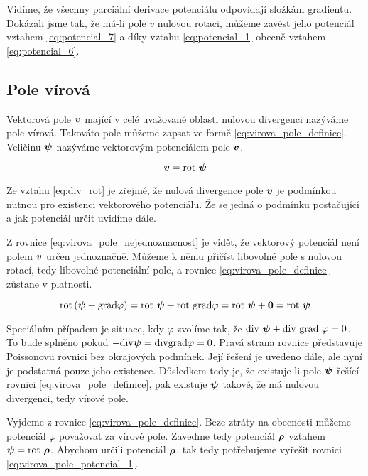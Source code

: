 Vidíme, že všechny parciální derivace potenciálu odpovídají složkám gradientu. Dokázali jsme tak, že má-li pole \(v\) nulovou rotaci, můžeme zavést jeho
potenciál vztahem \eqref{eq:potencial_7} a díky vztahu \eqref{eq:potencial_1} obecně vztahem \eqref{eq:potencial_6}.

\subsection{Pole vírová}
\label{sec:pole_virova}

Vektorová pole \(\boldsymbol{v}\) mající v celé uvažované oblasti nulovou divergenci nazýváme pole vírová. Takováto pole můžeme zapsat ve formě 
\eqref{eq:virova_pole_definice}. Veličinu \(\boldsymbol{\psi}\) nazýváme vektorovým potenciálem pole \(\boldsymbol{v}\).

\begin{equation}
\label{eq:virova_pole_definice}
\boldsymbol{v} = \mathrm{rot} \ \boldsymbol{\psi}
\end{equation}

Ze vztahu \eqref{eq:div_rot} je zřejmé, že nulová divergence pole \(\boldsymbol{v}\) je podmínkou nutnou pro existenci vektorového potenciálu. Že se jedná o podmínku postačující a jak potenciál určit uvidíme dále.

Z rovnice \eqref{eq:virova_pole_nejednoznacnost} je vidět, že vektorový potenciál není polem \(\boldsymbol{v}\) určen jednoznačně.
Můžeme k němu přičíst libovolné pole s nulovou rotací, tedy libovolné potenciální pole, a rovnice \eqref{eq:virova_pole_definice}
zůstane v platnosti.

\begin{equation}
\label{eq:virova_pole_nejednoznacnost}
\mathrm{rot} \left(\boldsymbol{\psi} + \mathrm{grad} \varphi \right) = \mathrm{rot} \ \boldsymbol{\psi} + \mathrm{rot} \ \mathrm{grad} \varphi =
\mathrm{rot} \ \boldsymbol{\psi} + \boldsymbol{0} = \mathrm{rot} \ \boldsymbol{\psi}
\end{equation}

Speciálním případem je situace, kdy \(\varphi\) zvolíme tak, že \(\mathrm{div} \ \boldsymbol{\psi} + \mathrm{div} \ \mathrm{grad} \ \varphi = 0\). To bude splněno pokud
\(-\mathrm{div} \boldsymbol{\psi} = \mathrm{div} \mathrm{grad} \varphi = 0\). Pravá strana rovnice představuje Poissonovu rovnici bez okrajových podmínek.
Její řešení je uvedeno dále, ale nyní je podstatná pouze jeho existence. Důsledkem tedy je, že existuje-li pole \(\boldsymbol{\psi}\) řešící
rovnici \eqref{eq:virova_pole_definice}, pak existuje \(\boldsymbol{\psi}\) takové, že má nulovou divergenci, tedy vírové pole.

Vyjdeme z rovnice \eqref{eq:virova_pole_definice}. Beze ztráty na obecnosti můžeme potenciál \(\varphi\) považovat za vírové pole.
Zaveďme tedy potenciál \(\boldsymbol{\rho}\) vztahem \(\boldsymbol{\psi} = \mathrm{rot} \ \boldsymbol{\rho}\). Abychom určili potenciál \(\boldsymbol{\rho}\), tak tedy
potřebujeme vyřešit rovnici \eqref{eq:virova_pole_potencial_1}.

